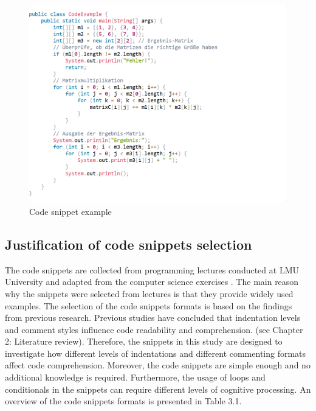 \begin{figure} [H]
  \centering
  \includegraphics[scale=1]{figures/codeb.png}
  \caption{Code snippet example }
  \label{fig:AnhangsChor}
\end{figure}




\subsection{Justification of code snippets selection }
The code snippets are collected from programming lectures conducted at LMU University and adapted from the computer science exercises \cite{lmu_programming_lectures}. The main reason why the snippets were selected from lectures is that they provide widely used examples. 
The selection of the code snippets formats is based on the findings from previous research. Previous studies have concluded that indentation levels and comment styles influence code readability and comprehension.  (see Chapter 2: Literature review). Therefore, the snippets in this study are designed to investigate how different levels of indentations and different commenting formats affect code comprehension.  Moreover, the code snippets are simple enough and no additional knowledge is required. Furthermore, the usage of loops and conditionals in the snippets can require different levels of cognitive processing.  An overview of the code snippets formats is presented in Table 3.1.   

